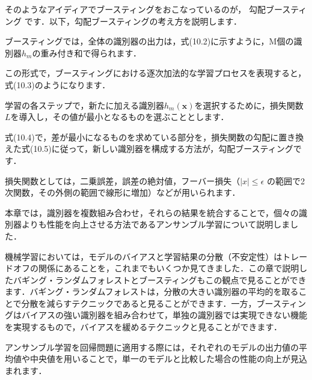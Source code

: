 そのようなアイディアでブースティングをおこなっているのが，
勾配ブースティング
です．以下，勾配ブースティングの考え方を説明します．

ブースティングでは，全体の識別器の出力は，式(10.2)に示すように，M個の識別器$h_m$の重み付き和で得られます．


この形式で，ブースティングにおける逐次加法的な学習プロセスを表現すると，
式(10.3)のようになります．


学習の各ステップで，新たに加える識別器$h_m(\bm{x})$を選択するために，損失関数$L$を導入し，その値が最小となるものを選ぶこととします．



式(10.4)で，差が最小になるものを求めている部分を，損失関数の勾配に置き換えた式(10.5)に従って，新しい識別器を構成する方法が，勾配ブースティングです．


損失関数としては，二乗誤差，誤差の絶対値，フーバー損失（$|x| \leq \epsilon$ の範囲で2次関数，その外側の範囲で線形に増加）などが用いられます．


本章では，識別器を複数組み合わせ，それらの結果を統合することで，個々の識別器よりも性能を向上させる方法であるアンサンブル学習について説明しました．

機械学習においては，モデルのバイアスと学習結果の分散（不安定性）はトレードオフの関係にあることを，これまでもいくつか見てきました．この章で説明したバギング・ランダムフォレストとブースティングもこの観点で見ることができます．バギング・ランダムフォレストは，分散の大きい識別器の平均的を取ることで分散を減らすテクニックであると見ることができます．一方，ブースティングはバイアスの強い識別器を組み合わせて，単独の識別器では実現できない機能を実現するもので，バイアスを緩めるテクニックと見ることができます．

アンサンブル学習を回帰問題に適用する際には，それぞれのモデルの出力値の平均値や中央値を用いることで，単一のモデルと比較した場合の性能の向上が見込まれます．
